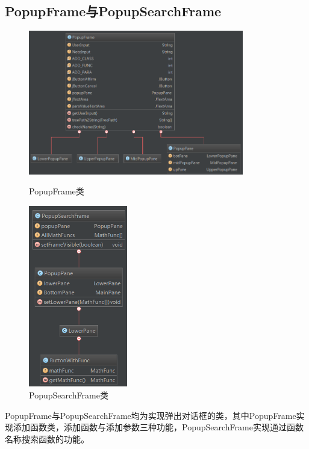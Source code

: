 \documentclass[hyperref, UTF8
,bookmarksnumbered=true, oneside]{ctexbook}
\begin{document}

		\subsection{PopupFrame与PopupSearchFrame} %
		\label{sub:popupframe}
			
			\begin{figure}[!h]
				\begin{minipage}[b]{0.6\textwidth}
				\centering
				\includegraphics[width=3.7in]{PopupFrame.png}
				\caption{PopupFrame类}
				\label{pic:MathPack}
				\end{minipage}%
				\hspace{0.05\textwidth}%
				\begin{minipage}[b]{0.3\textwidth}
				\centering
				\includegraphics[width=1.7in]{PopupSearchFrame.png}
				\caption{PopupSearchFrame类}
				\label{pic:GUIPack}
				\end{minipage}
			\end{figure}

			PopupFrame与PopupSearchFrame均为实现弹出对话框的类，其中PopupFrame实现添加函数类，添加函数与添加参数三种功能，PopupSearchFrame实现通过函数名称搜索函数的功能。
\end{document}
